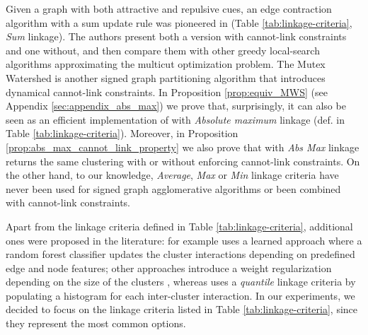 Given a graph with both attractive and repulsive cues, an edge contraction algorithm with a sum update rule was pioneered in \cite{levinkov2017comparative,keuper2015efficient} (Table \ref{tab:linkage-criteria}, \emph{Sum} linkage). The authors present both a version with cannot-link constraints and one without, and then compare them with other greedy local-search algorithms approximating the multicut optimization problem.
The Mutex Watershed \cite{wolf2018mutex} is another signed graph partitioning algorithm that introduces dynamical cannot-link constraints. In Proposition \ref{prop:equiv_MWS} (see Appendix \ref{sec:appendix_abs_max}) we prove that, surprisingly, it can also be seen as an efficient implementation of \algname{} with \emph{Absolute maximum} linkage (def. in Table \ref{tab:linkage-criteria}). Moreover, in Proposition \ref{prop:abs_max_cannot_link_property} we also prove that \algname{} with \emph{Abs Max} linkage returns the same clustering with or without enforcing cannot-link constraints.
On the other hand, to our knowledge, \emph{Average}, \emph{Max} or \emph{Min} linkage criteria have never been used for signed graph agglomerative algorithms or been combined with cannot-link constraints.

Apart from the linkage criteria defined in Table \ref{tab:linkage-criteria}, additional ones were proposed in the literature:
\cite{nunez2013machine} for example uses a learned approach where a random forest classifier updates the cluster interactions depending on predefined edge and node features; other approaches introduce a weight regularization depending on the size of the clusters \cite{felzenszwalb2004efficient,kardoostsolving}, whereas 
\cite{funke2018large} uses a \emph{quantile} linkage criteria by populating a histogram for each inter-cluster interaction. In our experiments, we decided to focus on the linkage criteria listed in Table \ref{tab:linkage-criteria}, since they represent the most common options.

